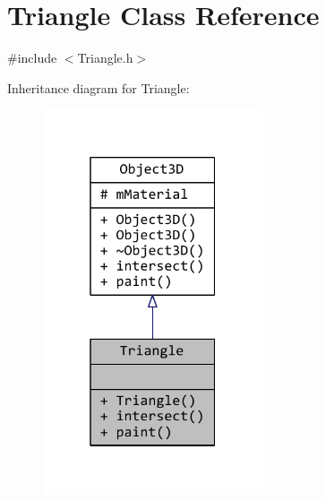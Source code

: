 \hypertarget{classTriangle}{\section{Triangle Class Reference}
\label{classTriangle}
}


{\ttfamily \#include $<$Triangle.\+h$>$}



Inheritance diagram for Triangle\+:
\nopagebreak
\begin{figure}[H]
\begin{center}
\leavevmode
\includegraphics[width=184pt]{classTriangle__inherit__graph}
\end{center}
\end{figure}



